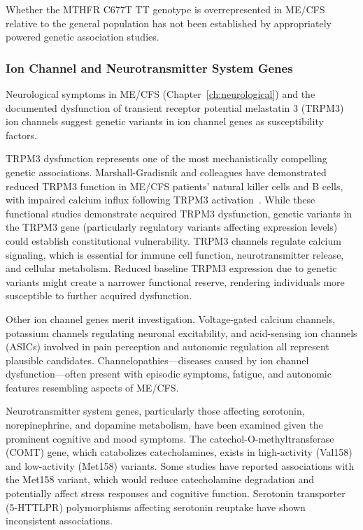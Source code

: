\begin{open_question}
\label{oq:mthfr-prevalence-mecfs}
Whether the MTHFR C677T TT genotype is overrepresented in ME/CFS relative to the general
population has not been established by appropriately powered genetic association studies.
\end{open_question}

\subsubsection{Ion Channel and Neurotransmitter System Genes}

Neurological symptoms in ME/CFS (Chapter~\ref{ch:neurological}) and the documented dysfunction of transient receptor potential melastatin 3 (TRPM3) ion channels suggest genetic variants in ion channel genes as susceptibility factors.

TRPM3 dysfunction represents one of the most mechanistically compelling genetic associations. Marshall-Gradisnik and colleagues have demonstrated reduced TRPM3 function in ME/CFS patients' natural killer cells and B cells, with impaired calcium influx following TRPM3 activation~\cite{MarshallGradisnik2016}. While these functional studies demonstrate acquired TRPM3 dysfunction, genetic variants in the TRPM3 gene (particularly regulatory variants affecting expression levels) could establish constitutional vulnerability. TRPM3 channels regulate calcium signaling, which is essential for immune cell function, neurotransmitter release, and cellular metabolism. Reduced baseline TRPM3 expression due to genetic variants might create a narrower functional reserve, rendering individuals more susceptible to further acquired dysfunction.

Other ion channel genes merit investigation. Voltage-gated calcium channels, potassium channels regulating neuronal excitability, and acid-sensing ion channels (ASICs) involved in pain perception and autonomic regulation all represent plausible candidates. Channelopathies---diseases caused by ion channel dysfunction---often present with episodic symptoms, fatigue, and autonomic features resembling aspects of ME/CFS.

Neurotransmitter system genes, particularly those affecting serotonin, norepinephrine, and dopamine metabolism, have been examined given the prominent cognitive and mood symptoms. The catechol-O-methyltransferase (COMT) gene, which catabolizes catecholamines, exists in high-activity (Val158) and low-activity (Met158) variants. Some studies have reported associations with the Met158 variant, which would reduce catecholamine degradation and potentially affect stress responses and cognitive function. Serotonin transporter (5-HTTLPR) polymorphisms affecting serotonin reuptake have shown inconsistent associations.

